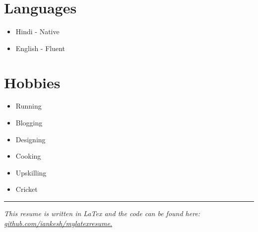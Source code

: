 \documentclass[11pt, a4paper]{article}
\begin{document}
\section*{\color{NavyBlue}Languages}
\vspace{-2mm}
\begin{itemize}[noitemsep, nolistsep,label=\textcolor{NavyBlue}{\scriptsize\faLanguage}]
\item Hindi - Native
\item English - Fluent
\end{itemize}

\section*{\color{NavyBlue}Hobbies}
\vspace{-2mm}
\begin{itemize}[noitemsep, nolistsep,label=\textcolor{NavyBlue}{\scriptsize\faStar}]
\item Running
\item Blogging
\item Designing
\item Cooking
\item Upskilling
\item Cricket
\end{itemize}

\textcolor{NavyBlue}{\rule{6.8in}{0.2mm}}
\vspace{-8mm}
\center \small \textit {This resume is written in LaTex and the code can be found here: {\href{https://github.com/iankesh/mylatexresume}{github.com/iankesh/mylatexresume.}}}
\end{document}
